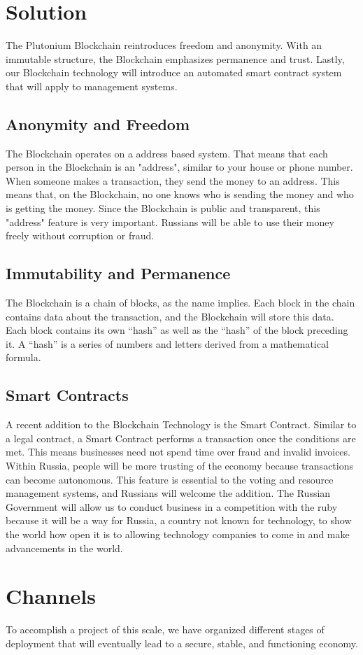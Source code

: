 \documentclass[12pt]{article}
\begin{document}
\section{Solution}
The Plutonium Blockchain reintroduces freedom and anonymity. With an immutable structure, the Blockchain emphasizes permanence and trust. Lastly, our Blockchain technology will introduce an automated smart contract system that will apply to management systems.
\subsection{Anonymity and Freedom}
The Blockchain operates on a address based system. That means that each person in the Blockchain is an "address", similar to your house or phone number. When someone makes a transaction, they send the money to an address. This means that, on the Blockchain, no one knows who is sending the money and who is getting the money. Since the Blockchain is public and transparent, this "address" feature is very important. Russians will be able to use their money freely without corruption or fraud.
\subsection{Immutability and Permanence}
The Blockchain is a chain of blocks, as the name implies. Each block in the chain contains data about the transaction, and the Blockchain will store this data. Each block contains its own ``hash'' as well as the ``hash'' of the block preceding it. A ``hash'' is a series of numbers and letters derived from a mathematical formula. 
\subsection{Smart Contracts}
A recent addition to the Blockchain Technology is the Smart Contract. Similar to a legal contract, a Smart Contract performs a transaction once the conditions are met. This means businesses need not spend time over fraud and invalid invoices. Within Russia, people will be more trusting of the economy because transactions can become autonomous. This feature is essential to the voting and resource management systems, and Russians will welcome the addition. The Russian Government will allow us to conduct business in a competition with the ruby because it will be a way for Russia, a country not known for technology, to show the world how open it is to allowing technology companies to come in and make advancements in the world.
\pagebreak
\section{Channels}
To accomplish a project of this scale, we have organized different stages of deployment that will eventually lead to a secure, stable, and functioning economy.
\end{document}
